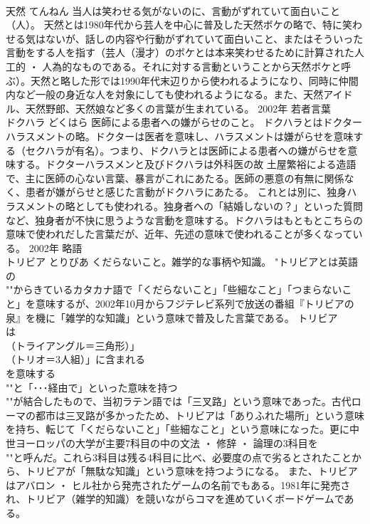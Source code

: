 \documentclass[8pt]{extreport}
\begin{document}
\begin{CJK}{UTF8}{min}
\\	天然	てんねん	当人は笑わせる気がないのに、言動がずれていて面白いこと（人）。	天然とは1980年代から芸人を中心に普及した天然ボケの略で、特に笑わせる気はないが、話しの内容や行動がずれていて面白いこと、またはそういった言動をする人を指す（芸人（漫才）のボケとは本来笑わせるために計算された人工的 ・ 人為的なものである。それに対する言動ということから天然ボケと呼ぶ）。天然と略した形では1990年代末辺りから使われるようになり、同時に仲間内など一般の身近な人を対象にしても使われるようになる。また、天然アイドル、天然野郎、天然娘など多くの言葉が生まれている。	2002年	若者言葉	
\\	ドクハラ	どくはら	医師による患者への嫌がらせのこと。	ドクハラとはドクターハラスメントの略。ドクターは医者を意味し、ハラスメントは嫌がらせを意味する（セクハラが有名）。つまり、ドクハラとは医師による患者への嫌がらせを意味する。ドクターハラスメンと及びドクハラは外科医の故 土屋繁裕による造語で、主に医師の心ない言葉、暴言がこれにあたる。医師の悪意の有無に関係なく、患者が嫌がらせと感じた言動がドクハラにあたる。 これとは別に、独身ハラスメントの略としても使われる。独身者への「結婚しないの？」といった質問など、独身者が不快に思うような言動を意味する。ドクハラはもともとこちらの意味で使われだした言葉だが、近年、先述の意味で使われることが多くなっている。	2002年	略語	
\\	トリビア	とりびあ	くだらないこと。雑学的な事柄や知識。	"トリビアとは英語の
\\	""からきているカタカナ語で「くだらないこと」「些細なこと」「つまらないこと」を意味するが、2002年10月からフジテレビ系列で放送の番組『トリビアの泉』を機に「雑学的な知識」という意味で普及した言葉である。 トリビア
\\	は
\\	（トライアングル＝三角形）」
\\	（トリオ＝3人組）」に含まれる
\\	を意味する
\\	""と「･･･経由で」といった意味を持つ
\\	""が結合したもので、当初ラテン語では「三叉路」という意味であった。古代ローマの都市は三叉路が多かったため、トリビアは「ありふれた場所」という意味を持ち、転じて「くだらないこと」「些細なこと」という意味になった。更に中世ヨーロッパの大学が主要7科目の中の文法 ・ 修辞 ・ 論理の3科目を
\\	""と呼んだ。これら3科目は残る4科目に比べ、必要度の点で劣るとされたことから、トリビアが「無駄な知識」という意味を持つようになる。 また、トリビアはアバロン ・ ヒル社から発売されたゲームの名前でもある。1981年に発売され、トリビア（雑学的知識）を競いながらコマを進めていくボードゲームである。

\end{CJK}
\end{document}
